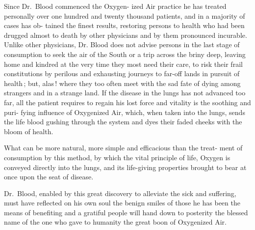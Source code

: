 \documentclass[10pt]{article}
\begin{document}
\begin{multicols}{3}
Since Dr.~Blood commenced the Oxygen-\linebreak
ized Air practice he has treated personally\linebreak
over one hundred and twenty thousand\linebreak
patients, and in a majority of cases has ob-\linebreak
tained the finest results, restoring persons to\linebreak
health who had been drugged almost to death\linebreak
by other physicians and by them pronounced\linebreak
incurable. Unlike other physicians, Dr.\linebreak
Blood does not advise persons in the last\linebreak
stage of consumption to seek the air of the\linebreak
South or a trip across the briny deep, leaving\linebreak
home and kindred at the very time they most\linebreak
need their care, to risk their frail constitutions\linebreak
by perilous and exhausting journeys to far-off\linebreak
lands in pursuit of health\,; but, alas\,! where\linebreak
they too often meet with the sad fate of dying\linebreak
among strangers and in a strange land. If\linebreak
the disease in the lungs has not advanced too\linebreak
far, all the patient requires to regain his lost\linebreak
force and vitality is the soothing and puri-\linebreak
fying influence of Oxygenized Air, which,\linebreak
when taken into the lungs, sends the life\linebreak
blood gushing through the system and dyes their faded cheeks with the\linebreak
bloom of health.

What can be more natural, more simple and efficacious than the treat-\linebreak
ment of consumption by this method, by which the vital principle of life,\linebreak
Oxygen is conveyed directly into the lungs, and its life-giving properties\linebreak
brought to bear at once upon the seat of disease.

Dr.~Blood, enabled by this great discovery to alleviate the sick and\linebreak
suffering, must have reflected on his own soul the benign smiles of those he\linebreak
has been the means of benefiting and a gratiful people will hand down to\linebreak
posterity the blessed name of the one who gave to humanity the great\linebreak
boon of Oxygenized Air.
\end{multicols}
\end{document}
